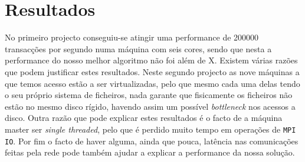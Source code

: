 \documentclass[a4paper]{article}
\begin{document}
\clearpage


\section{Resultados}
\indent \indent No primeiro projecto conseguiu-se atingir uma performance de 200000 transacções por segundo numa máquina com seis cores, sendo que nesta a performance do nosso melhor algoritmo não foi além de X. Existem várias razões que podem justificar estes resultados. Neste segundo projecto as nove máquinas a que temos acesso estão a ser virtualizadas, pelo que mesmo cada uma delas tendo o seu próprio sistema de ficheiros, nada garante que fisicamente os ficheiros não estão no mesmo disco rígido, havendo assim um possível \textit{bottleneck} nos acessos a disco. Outra razão que pode explicar estes resultados é o facto de a máquina master ser \textit{single threaded}, pelo que é perdido muito tempo em operações de \texttt{MPI IO}. Por fim o facto de haver alguma, ainda que pouca, latência nas comunicações feitas pela rede pode também ajudar a explicar a performance da nossa solução.
\end{document}
